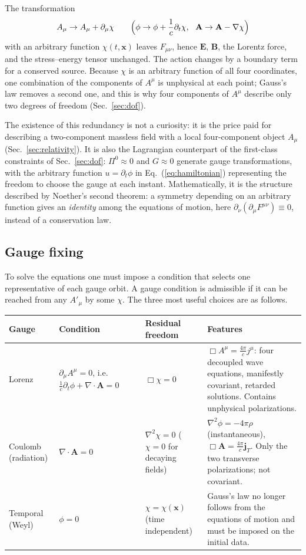 \documentclass[11pt,a4paper]{book}
\begin{document}
The transformation
\begin{equation}
A_\mu\to A_\mu+\partial_\mu\chi
\qquad\Bigl(\phi\to\phi+\frac1c\partial_t\chi,\ \ \mathbf A\to\mathbf A-\nabla\chi\Bigr)
\label{eq:gauge}
\end{equation}
with an arbitrary function $\chi(t,\mathbf x)$ leaves $F_{\mu\nu}$, hence $\mathbf E$, $\mathbf B$, the
Lorentz force, and the stress--energy tensor unchanged. The action changes by a boundary term
for a conserved source. Because $\chi$ is an arbitrary function of all four coordinates, one combination of the
components of $A^\mu$ is unphysical at each point; Gauss's law removes a second one, and this is why
four components of $A^\mu$ describe only two degrees of freedom (Sec.~\ref{sec:dof}).

The existence of this redundancy is not a curiosity: it is the price paid for describing a two-component
massless field with a local four-component object $A_\mu$ (Sec.~\ref{sec:relativity}). It is
also the Lagrangian counterpart of the first-class constraints of Sec.~\ref{sec:dof}:
$\Pi^0\approx0$ and $G\approx0$ generate gauge transformations, with the arbitrary function
$u=\partial_t\phi$ in Eq.~(\ref{eq:hamiltonian}) representing the freedom to choose the gauge
at each instant. Mathematically, it is the structure described by
Noether's second theorem: a symmetry depending on an arbitrary function gives an \emph{identity} among
the equations of motion, here $\partial_\nu(\partial_\mu F^{\mu\nu})\equiv0$, instead of a conservation law.

\subsection{Gauge fixing}

To solve the equations one must impose a condition that selects one representative of each gauge
orbit. A gauge condition is admissible if it can be reached from any $A'_\mu$ by some
$\chi$. The three most useful choices are as follows.

\begin{center}
\begin{tabular}{p{2.0cm}p{3.3cm}p{2.9cm}p{5.0cm}}
\hline
Gauge & Condition & Residual freedom & Features \\
\hline
Lorenz & $\partial_\mu A^\mu=0$, i.e.\ $\frac1c\partial_t\phi+\nabla\cdot\mathbf A=0$ &
$\Box\chi=0$ &
$\Box A^\mu=\frac{4\pi}c j^\mu$: four decoupled wave equations, manifestly covariant, retarded
solutions. Contains unphysical polarizations. \\[2pt]
Coulomb (radiation) & $\nabla\cdot\mathbf A=0$ &
$\nabla^2\chi=0$ ($\chi=0$ for decaying fields) &
$\nabla^2\phi=-4\pi\rho$ (instantaneous), $\Box\mathbf A=\frac{4\pi}c\mathbf j_T$. Only the two
transverse polarizations; not covariant. \\[2pt]
Temporal (Weyl) & $\phi=0$ & $\chi=\chi(\mathbf x)$ (time independent) &
Gauss's law no longer follows from the equations of motion and must be imposed on the initial data. \\
\hline
\end{tabular}
\end{center}
\end{document}
